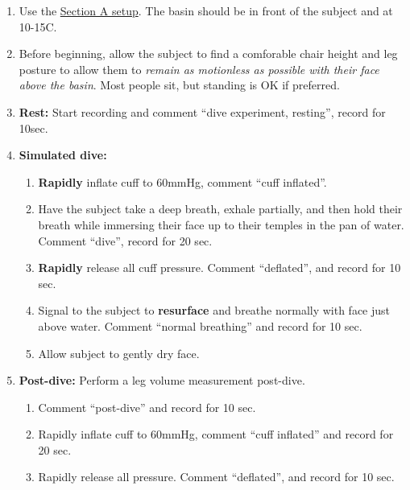 \documentclass[
  letterpaper,
  DIV=11,
  numbers=noendperiod,
  oneside]{scrartcl}
\providecommand{\tightlist}{%
  \setlength{\itemsep}{0pt}\setlength{\parskip}{0pt}}\usepackage{longtable,booktabs,array}
\begin{document}
\begin{enumerate}
\def\labelenumi{\arabic{enumi}.}
\tightlist
\item
  Use the \href{@sec-divesetup}{Section A setup}. The basin should be in
  front of the subject and at 10-15C.
\item
  Before beginning, allow the subject to find a comforable chair height
  and leg posture to allow them to \emph{remain as motionless as
  possible with their face above the basin}. Most people sit, but
  standing is OK if preferred.
\item
  \textbf{Rest:} Start recording and comment {``dive experiment,
  resting''}, record for 10sec.
\item
  \textbf{Simulated dive:}

  \begin{enumerate}
  \def\labelenumii{\alph{enumii}.}
  \tightlist
  \item
    \textbf{Rapidly} inflate cuff to 60mmHg, comment {``cuff
    inflated''}.\\
  \item
    Have the subject take a deep breath, exhale partially, and then hold
    their breath while immersing their face up to their temples in the
    pan of water. Comment {``dive''}, record for 20 sec.~
  \item
    \textbf{Rapidly} release all cuff pressure. Comment {``deflated''},
    and record for 10 sec.\\
  \item
    Signal to the subject to \textbf{resurface} and breathe normally
    with face just above water. Comment {``normal breathing''} and
    record for 10 sec.~
  \item
    Allow subject to gently dry face.
  \end{enumerate}
\item
  \textbf{Post-dive:} Perform a leg volume measurement post-dive.

  \begin{enumerate}
  \def\labelenumii{\alph{enumii}.}
  \tightlist
  \item
    Comment {``post-dive''} and record for 10 sec.~
  \item
    Rapidly inflate cuff to 60mmHg, comment {``cuff inflated''} and
    record for 20 sec.~
  \item
    Rapidly release all pressure. Comment {``deflated''}, and record for
    10 sec.~
  \end{enumerate}
\end{enumerate}
\end{document}
